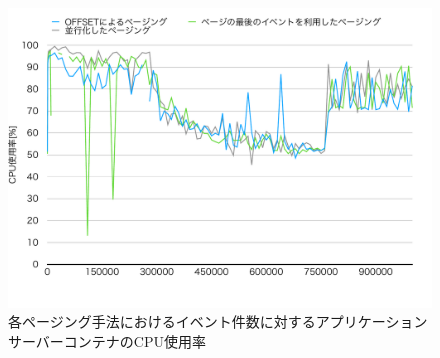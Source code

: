 \documentclass[../../../../../main]{subfiles}
\begin{document}
    \begin{figure}[H]
        \centering
        \includegraphics[width=12cm]{graph}
        \caption{各ページング手法におけるイベント件数に対するアプリケーションサーバーコンテナのCPU使用率}
        \label{fig:each-paging-app-cpu-app_1_1024-db_1_1024}
    \end{figure}
\end{document}
